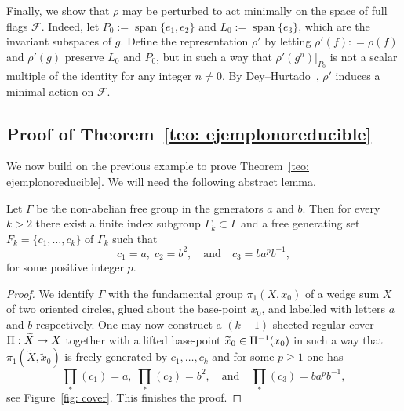 \documentclass[AHL,Unicode,longabstracts]{cedram}
\DeclareMathOperator{\spann}{span}
\newcommand{\F}{\mathcal{F}}
\renewcommand*{\to}{\mathchoice{\longrightarrow}{\rightarrow}{\rightarrow}{\rightarrow}}
\let\oldin\in
\renewcommand{\in}{\mathchoice{\oldin}{\oldin}{\,\oldin\,}{\,\oldin\,}}
\begin{document}
Finally, we show that $\rho$ may be perturbed to act minimally on the space of full flags $\F$. Indeed, let $P_0:=\spann\{e_1,e_2\}$ and $L_0:=\spann\{e_3\}$, which are the invariant subspaces of $g$. Define the representation $\rho'$ by letting $\rho'(f): = \rho(f)$ and $\rho'(g)$ preserve $L_0$ and $P_0$, but in such a way that $\rho'(g^n)\vert_{ P_0}$ is not a scalar multiple of the identity for any integer $n \neq 0$. By Dey--Hurtado~\cite[Proposition~5.4]{DeyHurfulllimit}, $\rho'$ induces a minimal action on $\F$.


\subsection{Proof of Theorem~\ref{teo: ejemplonoreducible}}\label{subsec: ex more generators}


We now build on the previous example to prove Theorem~\ref{teo: ejemplonoreducible}. We will need the following abstract lemma.



\begin{lemm}\label{lem: free generators of subgroups}
Let $\Gamma$ be the non-abelian free group in the generators $a$ and $b$.
Then for every $k>2$ there exist a finite index subgroup $\Gamma_k\subset\Gamma$ and a free generating set $F_k=\{c_1,\dots,c_k\}$ of $\Gamma_k$ such that
\[
c_1=a, \;c_2=b^2, \quad\text{and}\quad c_3=ba^pb^{-1},
\]
for some positive integer $p$.
\end{lemm}


\begin{proof}
We identify $\Gamma$ with the fundamental group $\pi_1(X,x_0)$ of a wedge sum $X$ of two oriented circles, glued about the base-point $x_0$, and labelled with letters $a$ and $b$ respectively.
One may now construct a $(k-1)$-sheeted regular cover $\Pi:\widetilde{X}\to X$ together with a lifted base-point $\widetilde{x}_0\in \Pi^{-1}(x_0)$ in such a way that $\pi_1(\widetilde{X},\widetilde{x}_0)$ is freely generated by $c_1,\dots, c_k$ and for some $p\geq 1$ one has
\[
\prod_*(c_1)=a, \;\prod_*(c_2)=b^2, \quad\text{and}\quad \prod_*(c_3)=ba^pb^{-1},
\]
see Figure~\ref{fig: cover}.
This finishes the proof.
\end{proof}
\end{document}
